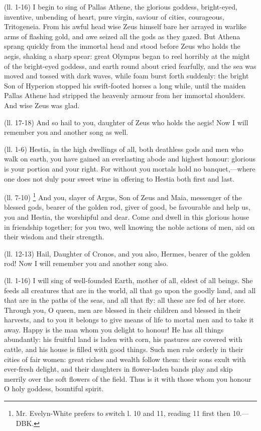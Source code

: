 
(ll. 1-16) I begin to sing of Pallas Athene, the glorious goddess, bright-eyed,
inventive, unbending of heart, pure virgin, saviour of cities, courageous,
Tritogeneia. From his awful head wise Zeus himself bare her arrayed in warlike
arms of flashing gold, and awe seized all the gods as they gazed. But Athena
sprang quickly from the immortal head and stood before Zeus who holds the
aegis, shaking a sharp spear: great Olympus began to reel horribly at the might
of the bright-eyed goddess, and earth round about cried fearfully, and the sea
was moved and tossed with dark waves, while foam burst forth suddenly: the
bright Son of Hyperion stopped his swift-footed horses a long while, until the
maiden Pallas Athene had stripped the heavenly armour from her immortal
shoulders. And wise Zeus was glad.

(ll. 17-18) And so hail to you, daughter of Zeus who holds the aegis! Now I
will remember you and another song as well.


(ll. 1-6) Hestia, in the high dwellings of all, both deathless gods and men who
walk on earth, you have gained an everlasting abode and highest honour:
glorious is your portion and your right. For without you mortals hold no
banquet,—where one does not duly pour sweet wine in offering to Hestia
both first and last.

(ll. 7-10) \footnote{Mr. Evelyn-White prefers
to switch l. 10 and 11, reading 11 first then 10.—DBK.} And you, slayer of Argus, Son of
Zeus and Maia, messenger of the blessed gods, bearer of the golden rod, giver
of good, be favourable and help us, you and Hestia, the worshipful and dear.
Come and dwell in this glorious house in friendship together; for you two, well
knowing the noble actions of men, aid on their wisdom and their strength.

(ll. 12-13) Hail, Daughter of Cronos, and you also, Hermes, bearer of the
golden rod! Now I will remember you and another song also.


(ll. 1-16) I will sing of well-founded Earth, mother of all, eldest of all
beings. She feeds all creatures that are in the world, all that go upon the
goodly land, and all that are in the paths of the seas, and all that fly: all
these are fed of her store. Through you, O queen, men are blessed in their
children and blessed in their harvests, and to you it belongs to give means of
life to mortal men and to take it away. Happy is the man whom you delight to
honour! He has all things abundantly: his fruitful land is laden with corn, his
pastures are covered with cattle, and his house is filled with good things.
Such men rule orderly in their cities of fair women: great riches and wealth
follow them: their sons exult with ever-fresh delight, and their daughters in
flower-laden bands play and skip merrily over the soft flowers of the field.
Thus is it with those whom you honour O holy goddess, bountiful spirit.

